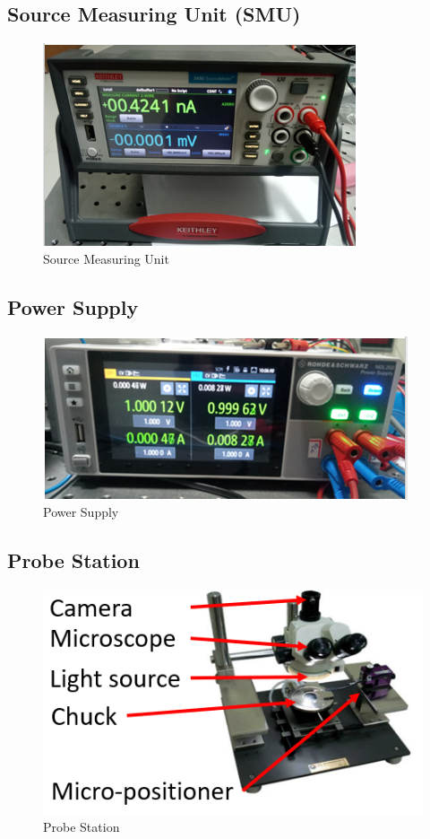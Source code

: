 \subsection{Source Measuring Unit (SMU)}
\begin{figure}[H]
	\centering
		
		\includegraphics{14.png}
		\caption{Source Measuring Unit}
\end{figure}
\subsection{Power Supply}
\begin{figure}[H]
	\centering
		
		\includegraphics{15.png}
		\caption{Power Supply}
\end{figure}
\subsection{Probe Station}
\begin{figure}[H]
	\centering
		
		\includegraphics{16.png}
		\caption{Probe Station}
\end{figure}
